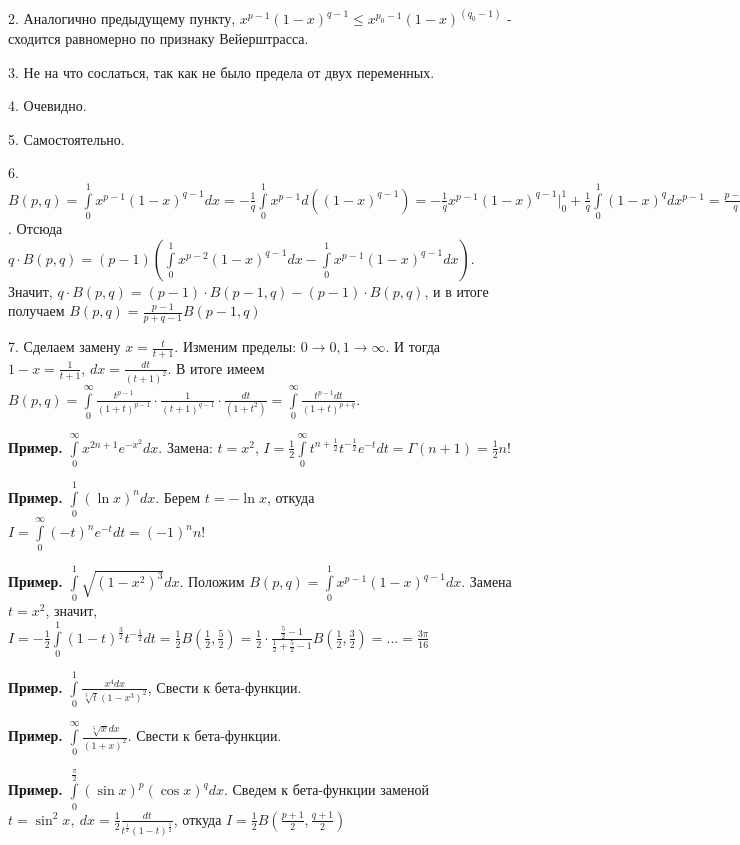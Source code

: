 2. Аналогично предыдущему пункту,
$x^{p-1}(1-x)^{q-1}\leqslant x^{p_0-1}(1-x)^(q_0-1)$ - 
сходится равномерно по признаку Вейерштрасса.

3. Не на что сослаться, так как не было предела от двух переменных.

4. Очевидно.

5. Самостоятельно.

6.  $B(p,q)=\int\limits_{0}^{1}x^{p-1}(1-x)^{q-1}dx=
-\frac{1}{q}\int\limits_{0}^{1}x^{p-1}d((1-x)^{q-1})=
-\frac{1}{q}x^{p-1}(1-x)^{q-1}\big|^1_0+\frac{1}{q}\int\limits_{0}^{1}
(1-x)^{q}dx^{p-1}=\frac{p-1}{q}\int\limits_{0}^{1}x^{p-2}(1-x)^{q-1}(1-x)dx$.
Отсюда $q\cdot B(p,q)=(p-1)\left(
 \int\limits_{0}^{1}x^{p-2}(1-x)^{q-1}dx-
\int\limits_{0}^{1}x^{p-1}(1-x)^{q-1}dx\right)$. Значит,
$q\cdot B(p,q)=(p-1)\cdot B(p-1,q)-(p-1)\cdot B(p,q)$, и в итоге получаем
$B(p,q)=\frac{p-1}{p+q-1}B(p-1,q)$


7. Сделаем замену $x=\frac{t}{t+1}$. Изменим пределы: 
$0\to 0,1\to \infty$. И тогда $1-x=\frac{1}{t+1}$, $dx=\frac{dt}{(t+1)^2}$.
В итоге имеем $B(p,q)=\int\limits_{0}^{\infty} \frac{t^{p-1}}{(1+t)^{p-1}}
\cdot \frac{1}{(t+1)^{q-1}}\cdot \frac{dt}{(1+t^2)}=
\int\limits_{0}^{\infty} \frac{t^{p-1}dt}{(1+t)^{p+q}}$. 





\textbf{Пример.} $\int\limits_{0}^{\infty} x^{2n+1}e^{-x^2}dx$. Замена:
$t=x^2$,  $I=\frac{1}{2}\int\limits_{0}^{\infty} t^{n+\frac{1}{2}}
t^{-\frac{1}{2}}e^{-t}dt=\Gamma(n+1)=\frac{1}{2}n!$ 

\textbf{Пример.} $\int\limits_{0}^{1} (\ln x)^ndx$. Берем $t=-\ln x$, откуда
$I=\int\limits_{0}^{\infty}(-t)^ne^{-t}dt=(-1)^nn!$

\textbf{Пример.} $\int\limits_{0}^{1}\sqrt{(1-x^2)^3}dx$. Положим
$B(p,q)=\int\limits_{0}^{1}x^{p-1}(1-x)^{q-1}dx$. Замена $t=x^2$, значит,
$I=-\frac{1}{2}\int\limits_{0}^{1}(1-t)^{\frac{3}{2}}t^{-\frac{1}{2}}dt=
\frac{1}{2}B(\frac{1}{2},\frac{5}{2})=\frac{1}{2}\cdot \frac{\frac{5}{2}-1}
{\frac{1}{2}+\frac{5}{2}-1}B(\frac{1}{2},\frac{3}{2})=...=
\frac{3\pi}{16}$ 

\textbf{Пример.} $\int\limits_{0}^{1} \frac{x^4dx}{\sqrt[3]t{(1-x^3)^2}}$,
Свести к бета-функции.

\textbf{Пример.} $\int\limits_{0}^{\infty}\frac{\sqrt[5]{x}dx}{(1+x)^2}$. 
Свести к бета-функции.

\textbf{Пример.} $\int\limits_{0}^{\frac{\pi}{2}}(\sin x)^p(\cos x)^qdx$.
Сведем к бета-функции заменой $t=\sin^2x,~dx=\frac{1}{2}\frac{dt}{
t^\frac{1}{2}(1-t)^\frac{1}{2}}$, откуда
$I=\frac{1}{2}B(\frac{p+1}{2},\frac{q+1}{2})$ 


